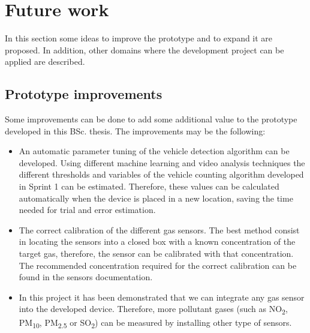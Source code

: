 \section{Future work}
In this section some ideas to improve the prototype and to expand it are proposed. In addition, other domains where the development project can be applied are described.

\subsection{Prototype improvements}
Some improvements can be done to add some additional value to the prototype developed in this \ac{BSc.} thesis. The improvements may be the following:
\begin{itemize}
	\item An automatic parameter tuning of the vehicle detection algorithm can be developed. Using different machine learning and video analysis techniques the different thresholds and variables of the vehicle counting algorithm developed in Sprint 1 can be estimated. Therefore, these values can be calculated automatically when the device is placed in a new location, saving the time needed for trial and error estimation. 
	
	\item The correct calibration of the different gas sensors. The best method consist in locating the sensors into a closed box with a known concentration of the target gas, therefore, the sensor can be calibrated with that concentration. The recommended concentration required for the correct calibration can be found in the sensors documentation. 
	
	\item In this project it has been demonstrated that we can integrate any gas sensor into the developed device. Therefore, more pollutant gases (such as NO\textsubscript{2}, PM\textsubscript{10}, PM\textsubscript{2.5} or  SO\textsubscript{2}) can be measured by installing other type of sensors.
	
\end{itemize}


